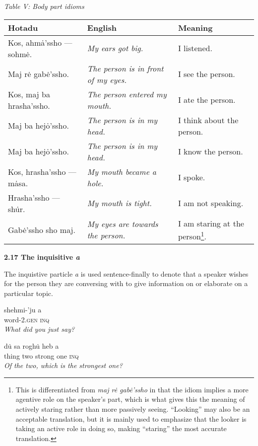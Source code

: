 \documentclass{article}[10pt]
\begin{document}
\begin{center}
\emph{Table V: Body part idioms}
\begin{tabularx}{\textwidth}{ |X|X|X| }
\hline
{\bf Hotadu} & \bf{English} & \bf{Meaning}\\ \hline
Kos, ahm\.{a}'ssho --- sohm\.{e}. & \emph{My ears got big.}  & I listened. \\ \hline
Maj r\.{e} gab\.{e}'ssho. & \emph{The person is in front of my eyes.} & I see the person. \\ \hline
Kos, maj ba hrasha'ssho. & \emph{The person entered my mouth.} & I ate the person. \\ \hline
Maj ba hej\.{o}'ssho. & \emph{The person is in my head.} & I think about the person. \\ \hline
Maj ba hej\.{o}'ssho. & \emph{The person is in my head.} & I know the person. \\ \hline
Kos, hrasha'ssho --- m\.{a}sa. & \emph{My mouth became a hole.} & I spoke. \\ \hline
Hrasha'ssho --- sh\.{u}r. & \emph{My mouth is tight.} & I am not speaking. \\ \hline
Gab\.{e}'ssho sho maj. & \emph{My eyes are towards the person.} & I am staring at the person\footnote{This is differentiated from \emph{maj r\.{e} gab\.{e}'ssho} in that the idiom implies a more agentive role on the speaker's part, which is what gives this the meaning of actively staring rather than more passively seeing. ``Looking'' may also be an acceptable translation, but it is mainly used to emphasize that the looker is taking an active role in doing so, making ``staring'' the most accurate translation.}. \\ \hline
\end{tabularx}
\end{center}
\vspace{3mm}

{\bf 2.17 The inquisitive \emph{a}}

The inquistive particle \emph{a} is used sentence-finally to denote that a speaker wishes for the person they are conversing with to give information on or elaborate on a particular topic.
\begin{exe}
\ex
\gll shehmi-'ju a\\
word-2.\textsc{gen} \textsc{inq}\\
\trans \emph{What did you just say?}

\ex
\gll d\.{u} sa rogh\.{u} heb a\\
thing two strong one \textsc{inq}\\
\trans \emph{Of the two, which is the strongest one?}
\end{exe}
\end{document}
